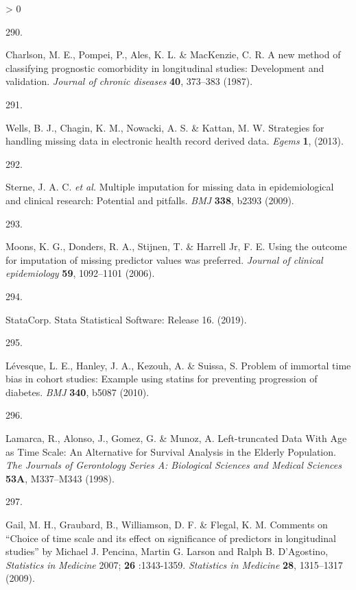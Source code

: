 \documentclass[a4paper, twoside]{templates/ociamthesis}
\newlength{\cslhangindent}
\newlength{\csllabelwidth}
\newenvironment{CSLReferences}[3] %
 {%
  \setlength{\parindent}{0pt}
  \ifodd #1 \everypar{\setlength{\hangindent}{\cslhangindent}}\ignorespaces\fi
  \ifnum #2 > 0
  \setlength{\parskip}{#2\baselineskip}
  \fi
 }%
 {}
\newcommand{\CSLLeftMargin}[1]{\parbox[t]{\maxof{\widthof{#1}}{\csllabelwidth}}{#1}}
\newcommand{\CSLRightInline}[1]{\parbox[t]{\linewidth - \csllabelwidth}{#1}}
\begin{document}
\begin{CSLReferences}{0}{0}
\leavevmode\hypertarget{ref-charlson1987new}{}%
\CSLLeftMargin{290. }
\CSLRightInline{Charlson, M. E., Pompei, P., Ales, K. L. \& MacKenzie, C. R. A new method of classifying prognostic comorbidity in longitudinal studies: Development and validation. \emph{Journal of chronic diseases} \textbf{40}, 373--383 (1987).}

\leavevmode\hypertarget{ref-wells2013strategies}{}%
\CSLLeftMargin{291. }
\CSLRightInline{Wells, B. J., Chagin, K. M., Nowacki, A. S. \& Kattan, M. W. Strategies for handling missing data in electronic health record derived data. \emph{Egems} \textbf{1}, (2013).}

\leavevmode\hypertarget{ref-sterne2009}{}%
\CSLLeftMargin{292. }
\CSLRightInline{Sterne, J. A. C. \emph{et al.} Multiple imputation for missing data in epidemiological and clinical research: Potential and pitfalls. \emph{BMJ} \textbf{338}, b2393 (2009).}

\leavevmode\hypertarget{ref-moons2006}{}%
\CSLLeftMargin{293. }
\CSLRightInline{Moons, K. G., Donders, R. A., Stijnen, T. \& Harrell Jr, F. E. Using the outcome for imputation of missing predictor values was preferred. \emph{Journal of clinical epidemiology} \textbf{59}, 1092--1101 (2006).}

\leavevmode\hypertarget{ref-statacorp2019}{}%
\CSLLeftMargin{294. }
\CSLRightInline{StataCorp. Stata {Statistical Software}: Release 16. (2019).}

\leavevmode\hypertarget{ref-levesque2010}{}%
\CSLLeftMargin{295. }
\CSLRightInline{Lévesque, L. E., Hanley, J. A., Kezouh, A. \& Suissa, S. Problem of immortal time bias in cohort studies: Example using statins for preventing progression of diabetes. \emph{BMJ} \textbf{340}, b5087 (2010).}

\leavevmode\hypertarget{ref-lamarca1998}{}%
\CSLLeftMargin{296. }
\CSLRightInline{Lamarca, R., Alonso, J., Gomez, G. \& Munoz, A. Left-truncated {Data With Age} as {Time Scale}: An {Alternative} for {Survival Analysis} in the {Elderly Population}. \emph{The Journals of Gerontology Series A: Biological Sciences and Medical Sciences} \textbf{53A}, M337--M343 (1998).}

\leavevmode\hypertarget{ref-gail2009}{}%
\CSLLeftMargin{297. }
\CSLRightInline{Gail, M. H., Graubard, B., Williamson, D. F. \& Flegal, K. M. Comments on {``{Choice} of time scale and its effect on significance of predictors in longitudinal studies''} by {Michael J}. {Pencina}, {Martin G}. {Larson} and {Ralph B}. {D}'{Agostino}, {\emph{Statistics}}{ \emph{in} }{\emph{Medicine}} 2007; {\textbf{26}} :1343-1359. \emph{Statistics in Medicine} \textbf{28}, 1315--1317 (2009).}


\end{CSLReferences}
\end{document}
